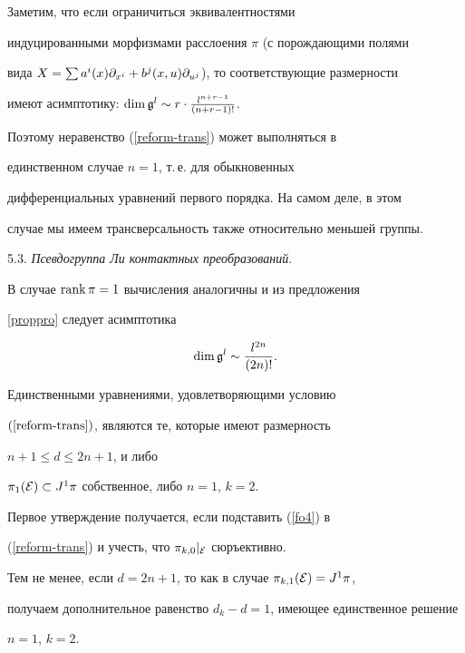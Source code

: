 Заметим, что если ограничиться эквивалентностями


индуцированными морфизмами расслоения $\pi$ (с порождающими полями


вида $X=\sum a^i(x)\partial_{x^i}+b^j(x,u)\partial_{u^j}$), то соответствующие размерности


имеют асимптотику: $\dim\g^l\sim


r\cdot\frac{l^{n+r-1}}{(n+r-1)!}$.


Поэтому неравенство (\ref{reform-trans}) может выполняться в


единственном случае $n=1$, т.\,е. для обыкновенных


дифференциальных уравнений первого порядка. На самом деле, в этом


случае мы имеем трансверсальность также относительно меньшей группы.


\medskip





5.3. {\it Псевдогруппа Ли контактных преобразований}.


В случае $\operatorname{rank}\pi=1$ вычисления аналогичны и из предложения


\ref{proppro} следует асимптотика


\begin{equation}


\label{fo4}


\dim\g^l\sim \dfrac{l^{2n}}{(2n)!}.


\end{equation}





\begin{prop}


Единственными уравнениями, удовлетворяющими условию


$(\ref{reform-trans})$, являются те, которые имеют размерность


$n+1\le d\le 2n+1$, и либо


$\pi_1({\cal E})\subset J^1\pi$ собственное, либо $n=1$, $k=2$.


\end{prop}





\begin{pf}


Первое утверждение получается, если подставить  (\ref{fo4}) в


(\ref{reform-trans}) и учесть, что $\pi_{k,0}|_{\cal E}$ сюръективно.


Тем не менее, если $d=2n+1$, то как в случае $\pi_{k,1}({\cal E})=J^1\pi$,


получаем дополнительное равенство $d_k-d=1$, имеющее единственное решение


$n=1$, $k=2$.


\end{pf}








